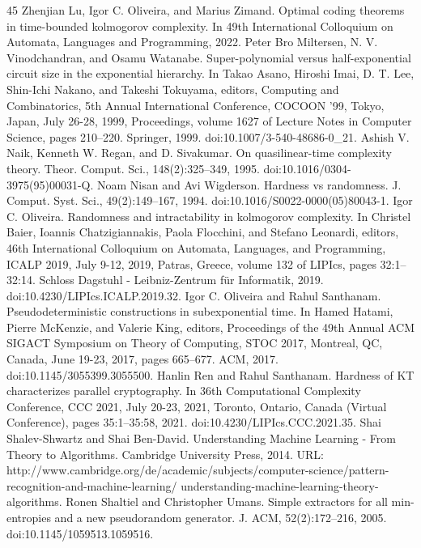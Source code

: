 \documentclass[10pt,a4paper]{article}
\begin{document}
\begin{thebibliography}{45}
 Zhenjian Lu, Igor C. Oliveira, and Marius Zimand. Optimal coding theorems in time-bounded kolmogorov complexity. In 49th International Colloquium on Automata, Languages and Programming, 2022.
 Peter Bro Miltersen, N. V. Vinodchandran, and Osamu Watanabe. Super-polynomial versus half-exponential circuit size in the exponential hierarchy. In Takao Asano, Hiroshi Imai, D. T. Lee, Shin-Ichi Nakano, and Takeshi Tokuyama, editors, Computing and Combinatorics, 5th Annual International Conference, COCOON ’99, Tokyo, Japan, July 26-28, 1999, Proceedings, volume 1627 of Lecture Notes in Computer Science, pages 210–220. Springer, 1999. doi:10.1007/3-540-48686-0\_21.
 Ashish V. Naik, Kenneth W. Regan, and D. Sivakumar. On quasilinear-time complexity theory. Theor. Comput. Sci., 148(2):325–349, 1995. doi:10.1016/0304-3975(95)00031-Q.
 Noam Nisan and Avi Wigderson. Hardness vs randomness. J. Comput. Syst. Sci., 49(2):149–167, 1994. doi:10.1016/S0022-0000(05)80043-1.
 Igor C. Oliveira. Randomness and intractability in kolmogorov complexity. In Christel Baier, Ioannis Chatzigiannakis, Paola Flocchini, and Stefano Leonardi, editors, 46th International Colloquium on Automata, Languages, and Programming, ICALP 2019, July 9-12, 2019, Patras, Greece, volume 132 of LIPIcs, pages 32:1–32:14. Schloss Dagstuhl - Leibniz-Zentrum für Informatik, 2019. doi:10.4230/LIPIcs.ICALP.2019.32.
 Igor C. Oliveira and Rahul Santhanam. Pseudodeterministic constructions in subexponential time. In Hamed Hatami, Pierre McKenzie, and Valerie King, editors, Proceedings of the 49th Annual ACM SIGACT Symposium on Theory of Computing, STOC 2017, Montreal, QC, Canada, June 19-23, 2017, pages 665–677. ACM, 2017. doi:10.1145/3055399.3055500.
 Hanlin Ren and Rahul Santhanam. Hardness of KT characterizes parallel cryptography. In 36th Computational Complexity Conference, CCC 2021, July 20-23, 2021, Toronto, Ontario, Canada (Virtual Conference), pages 35:1–35:58, 2021. doi:10.4230/LIPIcs.CCC.2021.35.
 Shai Shalev-Shwartz and Shai Ben-David. Understanding Machine Learning - From Theory to Algorithms. Cambridge University Press, 2014. URL: http://www.cambridge.org/de/academic/subjects/computer-science/pattern-recognition-and-machine-learning/ understanding-machine-learning-theory-algorithms.
 Ronen Shaltiel and Christopher Umans. Simple extractors for all min-entropies and a new pseudorandom generator. J. ACM, 52(2):172–216, 2005. doi:10.1145/1059513.1059516.

\end{thebibliography}
\end{document}
